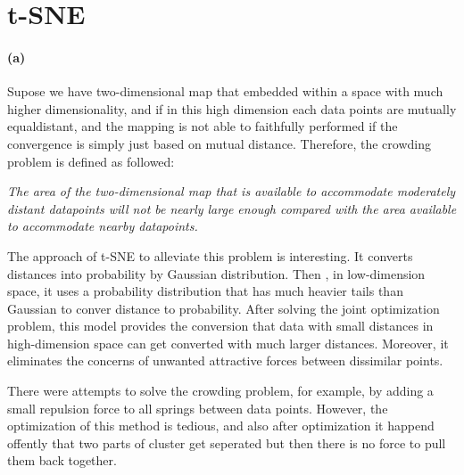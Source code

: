 \documentclass{article}
\begin{document}
\section{t-SNE}
\paragraph{(a)} Supose we have two-dimensional map that embedded within a space with much higher dimensionality, and if in this high dimension each data points are mutually equaldistant, and the mapping is not able to faithfully performed if the convergence is simply just based on mutual distance. Therefore, the crowding problem is defined as followed:

\textit{The area of the two-dimensional map that is available to accommodate moderately distant datapoints will not be nearly large enough compared with the area available to accommodate nearby datapoints.}

The approach of t-SNE to alleviate this problem is interesting. It converts distances into probability by Gaussian distribution. Then , in low-dimension space, it uses a probability distribution that has much heavier tails than Gaussian to conver distance to probability. After solving the joint optimization problem, this model provides the conversion that data with small distances in high-dimension space can get converted with much larger distances. Moreover, it eliminates the concerns of unwanted attractive forces between dissimilar points.

There were attempts to solve the crowding problem, for example, by adding a small repulsion force to all springs between data points. However, the optimization of this method is tedious, and also after optimization it happend offently that two parts of cluster get seperated but then there is no force to pull them back together.
\end{document}
